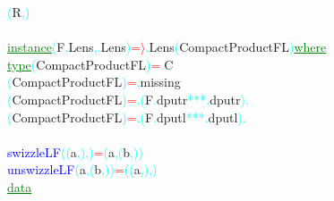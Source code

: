 \textcolor{cyan}{(}{\rm{}R}\textcolor{cyan}{,}\textcolor{cyan}{)}\\\\\textcolor{green}{\underline{instance}}\hsspace \textcolor{cyan}{(}{\rm{}F}\textcolor{cyan}{.}{\rm{}Lens}\textcolor{cyan}{,}\textcolor{cyan}{.}{\rm{}Lens}\textcolor{cyan}{)}\hsspace \textcolor{red}{=\ensuremath{\rangle}}\textcolor{cyan}{.}{\rm{}Lens}\hsspace \textcolor{cyan}{(}{\rm{}CompactProductFL}\textcolor{cyan}{)}\hsspace \textcolor{green}{\underline{where}}\\\hstab \textcolor{green}{\underline{type}}\hsspace \hsspace \textcolor{cyan}{(}{\rm{}CompactProductFL}\textcolor{cyan}{)}\hsspace \textcolor{red}{=}\textcolor{cyan}{.}{\rm{}C}\\\hsspace \textcolor{cyan}{(}{\rm{}CompactProductFL}\textcolor{cyan}{)}\hsspace \textcolor{red}{=}\textcolor{cyan}{.}{\rm{}missing}\\\hsspace \hsspace \hsspace \textcolor{cyan}{(}{\rm{}CompactProductFL}\textcolor{cyan}{)}\hsspace \textcolor{red}{=}\hsspace \textcolor{cyan}{.}\hsspace \textcolor{cyan}{(}{\rm{}F}\textcolor{cyan}{.}{\rm{}dputr}\hsspace \textcolor{cyan}{***}\textcolor{cyan}{.}{\rm{}dputr}\textcolor{cyan}{)}\hsspace \textcolor{cyan}{.}\\\hsspace \hsspace \hsspace \textcolor{cyan}{(}{\rm{}CompactProductFL}\textcolor{cyan}{)}\hsspace \textcolor{red}{=}\hsspace \textcolor{cyan}{.}\hsspace \textcolor{cyan}{(}{\rm{}F}\textcolor{cyan}{.}{\rm{}dputl}\hsspace \textcolor{cyan}{***}\textcolor{cyan}{.}{\rm{}dputl}\textcolor{cyan}{)}\hsspace \textcolor{cyan}{.}\\\\\textcolor{blue}{swizzleLF}\hsspace \hsspace \hsspace \textcolor{cyan}{(}\textcolor{cyan}{(}{\rm{}a}\textcolor{cyan}{,}\textcolor{cyan}{)}\textcolor{cyan}{,}\textcolor{cyan}{)}\hsspace \textcolor{red}{=}\hsspace \textcolor{cyan}{(}{\rm{}a}\textcolor{cyan}{,}\hsspace \textcolor{cyan}{(}{\rm{}b}\textcolor{cyan}{,}\textcolor{cyan}{)}\textcolor{cyan}{)}\\\textcolor{blue}{unswizzleLF}\hsspace \textcolor{cyan}{(}{\rm{}a}\textcolor{cyan}{,}\hsspace \textcolor{cyan}{(}{\rm{}b}\textcolor{cyan}{,}\textcolor{cyan}{)}\textcolor{cyan}{)}\hsspace \textcolor{red}{=}\hsspace \textcolor{cyan}{(}\textcolor{cyan}{(}{\rm{}a}\textcolor{cyan}{,}\textcolor{cyan}{)}\textcolor{cyan}{,}\textcolor{cyan}{)}\\\textcolor{green}{\underline{data}}\hsspace 